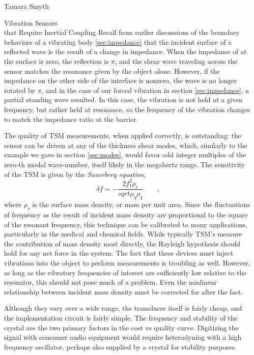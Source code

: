 \documentclass[a4paper,10pt]{report}
\numberwithin{equation}{section}
\begin{document}
\begin{chapter}{Tamara Smyth}
\begin{section}{Vibration Sensors \\that Require Inertial Coupling}
Recall from earlier discussions of the boundary behaviors of a vibrating body \ref{sec:impedance} that the incident surface of a reflected wave is the result of a change in impedance. When the impedance of at the surface is zero, the reflection is $\pi$, and the shear wave traveling across the sensor matches the resonance given by the object alone. However, if the impedance on the other side of the interface is nonzero, the wave is no longer rotated by $\pi$, and in the case of our forced vibration in section \ref{sec:impedance}, a partial standing wave resulted. \cite[p.~119]{Cremer1973} In this case, the vibration is not held at a given frequency, but rather held at resonance, so the frequency of the vibration changes to match the impedance ratio at the barrier. 

The quality of TSM measurements, when applied correctly, is outstanding: the sensor can be driven at any of the thickness shear modes, which, similarly to the example we gave in section \ref{sec:modes}, would favor odd integer multiples of the zero-th modal wave-number, itself likely in the megahertz range. The sensitivity of the TSM is given by the \emph{Sauerbrey equation},\cite[p.~44]{Ballantine1997}
\begin{equation*}
\delta f = - \frac{2 f_1^2 \rho_s}{sqrt{\mu_q \rho_q}} \qquad \text{,}
\end{equation*}
where $\rho_s$ is the surface mass density, or mass per unit area. Since the fluctuations of frequency as the result of incident mass density are proportional to the square of the resonant frequency, this technique can be calibrated to many applications, particularly in the medical and chemical fields. While typically TSM's measure the contribution of mass density most directly, the Rayleigh hypothesis should hold for any net force in the system. The fact that these devices must inject vibrations into the object to perform measurements is troubling as well. However, as long as the vibratory frequencies of interest are sufficiently low relative to the resonator, this should not pose much of a problem. Even the nonlinear relationship between incident mass density must be corrected for after the fact.

Although they vary over a wide range, the transducer itself is fairly cheap, and the implementation circuit is fairly simple. The frequency and stability of the crystal are the two primary factors in the cost vs quality curve. Digitizing the signal with consumer audio equipment would require heterodyning with a high frequency oscillator, perhaps also supplied by a crystal for stability purposes.


\end{section}
\end{chapter}
\end{document}
